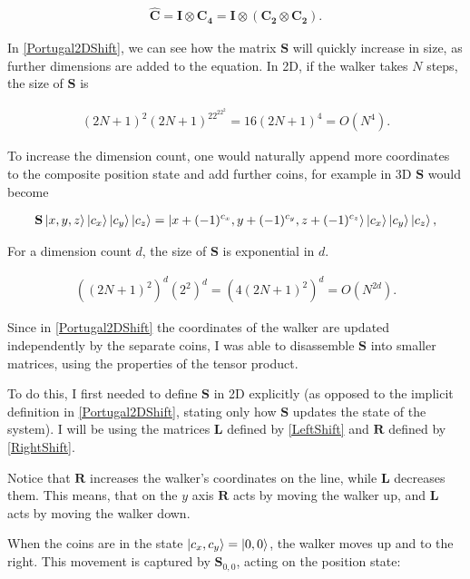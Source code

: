 \begin{align}
\mathbf{\hat{C}} = \mathbf{I} \otimes \mathbf{C_4} = \mathbf{I} \otimes (\mathbf{C_2} \otimes \mathbf{C_2}).
\end{align}


In \ref{Portugal2DShift}, we can see how the matrix $\mathbf{S}$ will quickly increase in size, as further dimensions are
added to the equation. In 2D, if the walker takes $N$ steps, the size of $\mathbf{S}$ is

\begin{align*}
(2N+1)^2(2N+1)^22^22^2 = 16(2N+1)^4 = O(N^4).
\end{align*}

To increase the dimension count, one would naturally append more coordinates to the composite position state and add further coins, for example in 3D $\mathbf{S}$ would become

\begin{align*}
    \mathbf{S}\ket{x,y,z}\ket{c_x}\ket{c_y}\ket{c_z} =
    \ket{x + (-1)^{c_x}, y + (-1)^{c_y}, z + (-1)^{c_z}}\ket{c_x}\ket{c_y}\ket{c_z},
\end{align*}

For a dimension count $d$, the size of $\mathbf{S}$ is exponential in $d$.

\begin{align*}
((2N+1)^2)^d(2^2)^d = (4(2N+1)^2)^d = O(N^{2d}).
\end{align*}


Since in \ref{Portugal2DShift} the coordinates of the walker are updated independently by the separate coins, I was able to disassemble $\mathbf{S}$ into smaller matrices, using the properties of the tensor product.

To do this, I first needed to define $\mathbf{S}$ in 2D explicitly (as opposed to the implicit definition in \ref{Portugal2DShift}, stating only how $\mathbf{S}$ updates the state of the system). I will be using the matrices $\mathbf{L}$ defined by \ref{LeftShift} and $\mathbf{R}$ defined by \ref{RightShift}.

Notice that $\mathbf{R}$ increases the walker's coordinates on the line, while $\mathbf{L}$ decreases them. This means, that on the $y$ axis $\mathbf{R}$ acts by moving the walker up, and $\mathbf{L}$ acts by moving the walker down.

When the coins are in the state $\ket{c_x,c_y} = \ket{0,0}$, the walker moves up and to the right. This movement is captured by $\mathbf{S}_{0,0}$, acting on the position state:

